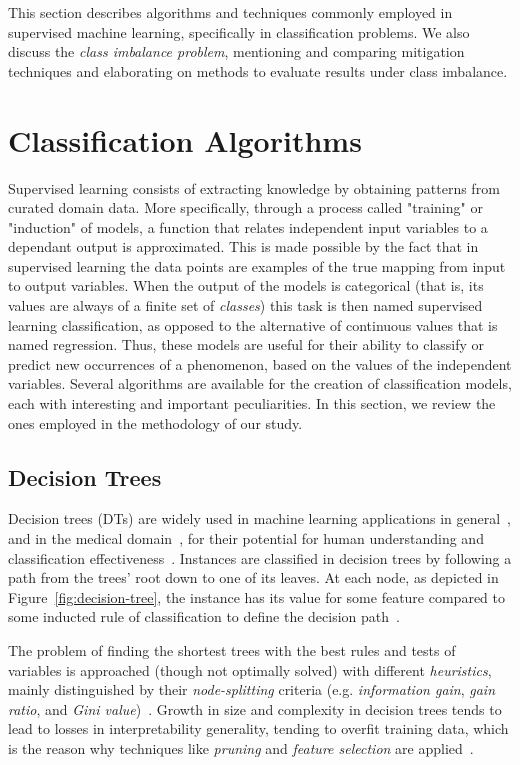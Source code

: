This section describes algorithms and techniques commonly employed in supervised machine learning, specifically in classification problems.
We also discuss the \textit{class imbalance problem}, mentioning and comparing mitigation techniques and elaborating on methods to evaluate results under class imbalance.


\section{Classification Algorithms} \label{sec:classification_algorithms}

Supervised learning consists of extracting knowledge by obtaining patterns from curated domain data.
More specifically, through a process called "training" or "induction" of models, a function that relates independent input variables to a dependant output is approximated.
This is made possible by the fact that in supervised learning the data points are examples of the true mapping from input to output variables.
When the output of the models is categorical (that is, its values are always of a finite set of \textit{classes}) this task is then named supervised learning classification, as opposed to the alternative of continuous values that is named regression.
Thus, these models are useful for their ability to classify or predict new occurrences of a phenomenon, based on the values of the independent variables.
Several algorithms are available for the creation of classification models, each with interesting and important peculiarities.
In this section, we review the ones employed in the methodology of our study.

\subsection{Decision Trees} \label{subsec:decision_trees}

Decision trees (DTs) are widely used in machine learning applications in general~\cite{Kotsiantis2013}, and in the medical domain~\cite{Burke2019}, for their potential for human understanding and classification effectiveness~\cite{Podgorelec2002}.
Instances are classified in decision trees by following a path from the trees' root down to one of its leaves.
At each node, as depicted in Figure~\ref{fig:decision-tree}, the instance has its value for some feature compared to some inducted rule of classification to define the decision path~\cite{Kubat2017}.

The problem of finding the shortest trees with the best rules and tests of variables is approached (though not optimally solved) with different \textit{heuristics}, mainly distinguished by their \textit{node-splitting} criteria (e.g. \textit{information gain}, \textit{gain ratio}, and \textit{Gini value})~\cite{Kotsiantis2013}.
Growth in size and complexity in decision trees tends to lead to losses in interpretability generality, tending to overfit training data, which is the reason why techniques like \textit{pruning} and \textit{feature selection} are applied~\cite{Kotsiantis2013}.

